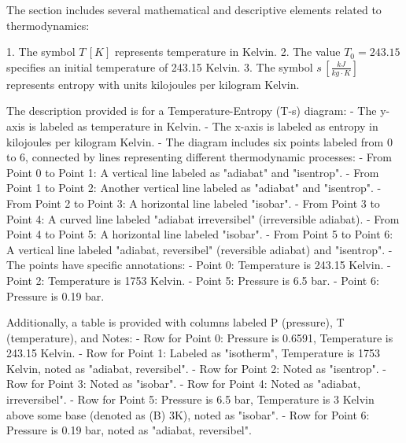 The section includes several mathematical and descriptive elements related to thermodynamics:

1. The symbol \( T \, [K] \) represents temperature in Kelvin.
2. The value \( T_0 = 243.15 \) specifies an initial temperature of 243.15 Kelvin.
3. The symbol \( s \, \left[ \frac{kJ}{kg \cdot K} \right] \) represents entropy with units kilojoules per kilogram Kelvin.

The description provided is for a Temperature-Entropy (T-s) diagram:
- The y-axis is labeled as temperature in Kelvin.
- The x-axis is labeled as entropy in kilojoules per kilogram Kelvin.
- The diagram includes six points labeled from 0 to 6, connected by lines representing different thermodynamic processes:
  - From Point 0 to Point 1: A vertical line labeled as "adiabat" and "isentrop".
  - From Point 1 to Point 2: Another vertical line labeled as "adiabat" and "isentrop".
  - From Point 2 to Point 3: A horizontal line labeled "isobar".
  - From Point 3 to Point 4: A curved line labeled "adiabat irreversibel" (irreversible adiabat).
  - From Point 4 to Point 5: A horizontal line labeled "isobar".
  - From Point 5 to Point 6: A vertical line labeled "adiabat, reversibel" (reversible adiabat) and "isentrop".
- The points have specific annotations:
  - Point 0: Temperature is 243.15 Kelvin.
  - Point 2: Temperature is 1753 Kelvin.
  - Point 5: Pressure is 6.5 bar.
  - Point 6: Pressure is 0.19 bar.

Additionally, a table is provided with columns labeled P (pressure), T (temperature), and Notes:
- Row for Point 0: Pressure is 0.6591, Temperature is 243.15 Kelvin.
- Row for Point 1: Labeled as "isotherm", Temperature is 1753 Kelvin, noted as "adiabat, reversibel".
- Row for Point 2: Noted as "isentrop".
- Row for Point 3: Noted as "isobar".
- Row for Point 4: Noted as "adiabat, irreversibel".
- Row for Point 5: Pressure is 6.5 bar, Temperature is 3 Kelvin above some base (denoted as (B) 3K), noted as "isobar".
- Row for Point 6: Pressure is 0.19 bar, noted as "adiabat, reversibel".